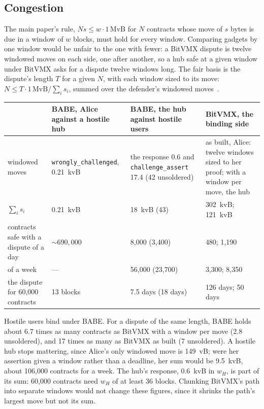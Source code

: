 \documentclass[11pt]{article}
\newcommand{\tx}[1]{\texttt{#1}}
\begin{document}
\subsection{Congestion}

The main paper's rule, $N s \le w \cdot 1\,\mathrm{MvB}$ for $N$
contracts whose move of $s$ bytes is due in a window of $w$ blocks, must
hold for every window. Comparing gadgets by one window would be unfair
to the one with fewer: a BitVMX dispute is twelve windowed moves on each
side, one after another, so a hub safe at a given window under BitVMX
asks for a dispute twelve windows long. The fair basis is the dispute's
length $T$ for a given $N$, with each window sized to its move:
$N \le T \cdot 1\,\mathrm{MvB} / \sum_i s_i$, summed over the defender's
windowed moves~\cite[\S 9]{lichenbitvmx}.
\begin{center}
\small
\begin{tabularx}{\linewidth}{>{\raggedright\arraybackslash}p{34mm}LLL}
\toprule
& BABE, Alice against a hostile hub & BABE, the hub against hostile users & BitVMX, the binding side \\
\midrule
windowed moves & \tx{wrongly\_challenged}, 0.21~kvB & the response 0.6 and \tx{challenge\_assert} 17.4 (42 unsoldered) & as built, Alice: twelve windows sized to her proof; with a window per move, the hub \\
$\sum_i s_i$ & 0.21~kvB & 18~kvB (43) & 302~kvB; 121~kvB \\
contracts safe with a dispute of a day & ${\sim}690{,}000$ & 8,000 (3,400) & 480; 1,190 \\
of a week & --- & 56,000 (23,700) & 3,300; 8,350 \\
the dispute for 60,000 contracts & 13 blocks & 7.5 days (18 days) & 126 days; 50 days \\
\bottomrule
\end{tabularx}
\end{center}
Hostile users bind under BABE. For a dispute of the same length, BABE
holds about 6.7 times as many contracts as BitVMX with a window per move
(2.8 unsoldered), and 17 times as many as BitVMX as built (7 unsoldered).
A hostile hub stops mattering, since Alice's only windowed move is
149~vB; were her assertion given a window rather than a deadline, her
sum would be 9.5~kvB, about 106,000 contracts for a week. The hub's
response, 0.6~kvB in $w_H$, is part of its sum: 60,000 contracts need
$w_H$ of at least 36 blocks. Chunking BitVMX's path into separate windows
would not change these figures, since it shrinks the path's largest move
but not its sum.
\end{document}
